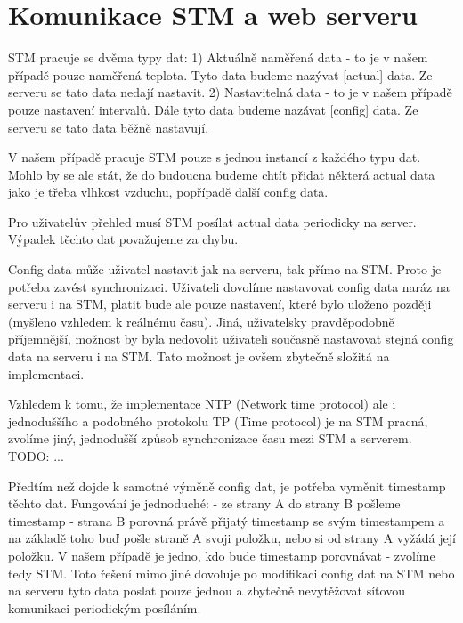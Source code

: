 \section{Komunikace STM a web serveru}

STM pracuje se dvěma typy dat:
1) Aktuálně naměřená data - to je v našem případě pouze naměřená teplota. Tyto data budeme nazývat [actual] data.
Ze serveru se tato data nedají nastavit.
2) Nastavitelná data - to je v našem případě pouze nastavení intervalů. Dále tyto data budeme nazávat [config] data.
Ze serveru se tato data běžně nastavují.

V našem případě pracuje STM pouze s jednou instancí z každého typu dat.
Mohlo by se ale stát, že do budoucna budeme chtít přidat některá actual data jako je
třeba vlhkost vzduchu, popřípadě další config data.

Pro uživatelův přehled musí STM posílat actual data periodicky na server.
Výpadek těchto dat považujeme za chybu.

Config data může uživatel nastavit jak na serveru, tak přímo na STM.
Proto je potřeba zavést synchronizaci.
Uživateli dovolíme nastavovat config data naráz na serveru i na STM, platit bude ale pouze
nastavení, které bylo uloženo později (myšleno vzhledem k reálnému času).
Jiná, uživatelsky pravděpodobně příjemnější, možnost by byla nedovolit uživateli současně
nastavovat stejná config data na serveru i na STM.
Tato možnost je ovšem zbytečně složitá na implementaci.

Vzhledem k tomu, že implementace NTP (Network time protocol) ale i jednoduššího a podobného
protokolu TP (Time protocol) je na STM pracná, zvolíme jiný, jednodušší způsob synchronizace
času mezi STM a serverem.
TODO: ...

Předtím než dojde k samotné výměně config dat, je potřeba vyměnit timestamp těchto dat.
Fungování je jednoduché:
- ze strany A do strany B pošleme timestamp
- strana B porovná právě přijatý timestamp se svým timestampem a na základě toho buď pošle
    straně A svoji položku, nebo si od strany A vyžádá její položku.
V našem případě je jedno, kdo bude timestamp porovnávat - zvolíme tedy STM.
Toto řešení mimo jiné dovoluje po modifikaci config dat na STM nebo na serveru
tyto data poslat pouze jednou a zbytečně nevytěžovat síťovou komunikaci periodickým
posíláním.


